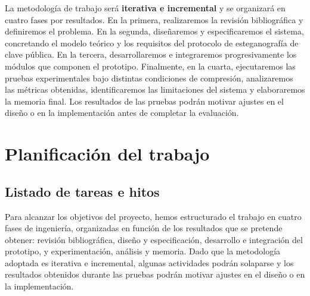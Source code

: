\documentclass[IB]{TFUOC}%
\begin{document}
La metodología de trabajo será \textbf{iterativa e incremental} y se organizará en cuatro fases por resultados. En la primera, realizaremos la revisión bibliográfica y definiremos el problema. En la segunda, diseñaremos y especificaremos el sistema, concretando el modelo teórico y los requisitos del protocolo de esteganografía de clave pública. En la tercera, desarrollaremos e integraremos progresivamente los módulos que componen el prototipo. Finalmente, en la cuarta, ejecutaremos las pruebas experimentales bajo distintas condiciones de compresión, analizaremos las métricas obtenidas, identificaremos las limitaciones del sistema y elaboraremos la memoria final. Los resultados de las pruebas podrán motivar ajustes en el diseño o en la implementación antes de completar la evaluación.


\section{Planificación del trabajo}



\subsection{Listado de tareas e hitos}
\label{subsec:planificacion_tareas}

Para alcanzar los objetivos del proyecto, hemos estructurado el trabajo en cuatro fases de ingeniería, organizadas en función de los resultados que se pretende obtener: revisión bibliográfica, diseño y especificación, desarrollo e integración del prototipo, y experimentación, análisis y memoria. Dado que la metodología adoptada es iterativa e incremental, algunas actividades podrán solaparse y los resultados obtenidos durante las pruebas podrán motivar ajustes en el diseño o en la implementación.
\end{document}
